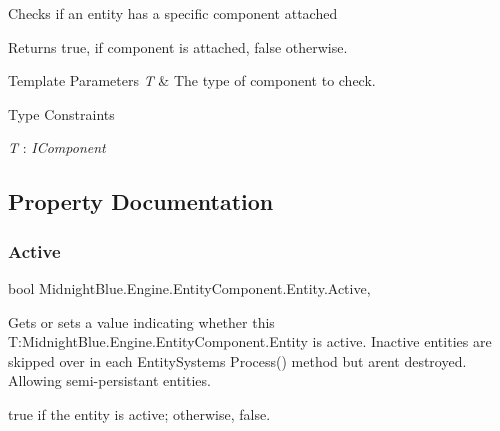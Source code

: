 Checks if an entity has a specific component attached 

\begin{DoxyReturn}{Returns}
{\ttfamily true}, if component is attached, {\ttfamily false} otherwise.
\end{DoxyReturn}

\begin{DoxyTemplParams}{Template Parameters}
{\em T} & The type of component to check.\\
\hline
\end{DoxyTemplParams}
\begin{Desc}
\item[Type Constraints]\begin{description}
\item[{\em T} : {\em I\+Component}]\end{description}
\end{Desc}


\subsection{Property Documentation}
\hypertarget{class_midnight_blue_1_1_engine_1_1_entity_component_1_1_entity_a746382aa60e12465f1d4df0523dbbf50}{}\label{class_midnight_blue_1_1_engine_1_1_entity_component_1_1_entity_a746382aa60e12465f1d4df0523dbbf50} 
\subsubsection{\texorpdfstring{Active}{Active}}
{\footnotesize\ttfamily bool Midnight\+Blue.\+Engine.\+Entity\+Component.\+Entity.\+Active\hspace{0.3cm}{\ttfamily [get]}, {\ttfamily [set]}}



Gets or sets a value indicating whether this T\+:\+Midnight\+Blue.\+Engine.\+Entity\+Component.\+Entity is active. Inactive entities are skipped over in each Entity\+Systems Process() method but aren\textquotesingle{}t destroyed. Allowing semi-\/persistant entities. 

{\ttfamily true} if the entity is active; otherwise, {\ttfamily false}.\hypertarget{class_midnight_blue_1_1_engine_1_1_entity_component_1_1_entity_ab78b270aa9552e6de6d5fcdb60bf4b59}{}\label{class_midnight_blue_1_1_engine_1_1_entity_component_1_1_entity_ab78b270aa9552e6de6d5fcdb60bf4b59} 
